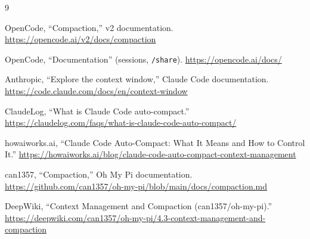 \documentclass[11pt]{article}
\begin{document}
\begin{thebibliography}{9}

OpenCode, ``Compaction,'' v2 documentation.
\url{https://opencode.ai/v2/docs/compaction}

OpenCode, ``Documentation'' (sessions, \texttt{/share}).
\url{https://opencode.ai/docs/}

Anthropic, ``Explore the context window,'' Claude Code documentation.
\url{https://code.claude.com/docs/en/context-window}

ClaudeLog, ``What is Claude Code auto-compact.''
\url{https://claudelog.com/faqs/what-is-claude-code-auto-compact/}

howaiworks.ai, ``Claude Code Auto-Compact: What It Means and How to Control It.''
\url{https://howaiworks.ai/blog/claude-code-auto-compact-context-management}

can1357, ``Compaction,'' Oh My Pi documentation.
\url{https://github.com/can1357/oh-my-pi/blob/main/docs/compaction.md}

DeepWiki, ``Context Management and Compaction (can1357/oh-my-pi).''
\url{https://deepwiki.com/can1357/oh-my-pi/4.3-context-management-and-compaction}

\end{thebibliography}
\end{document}
